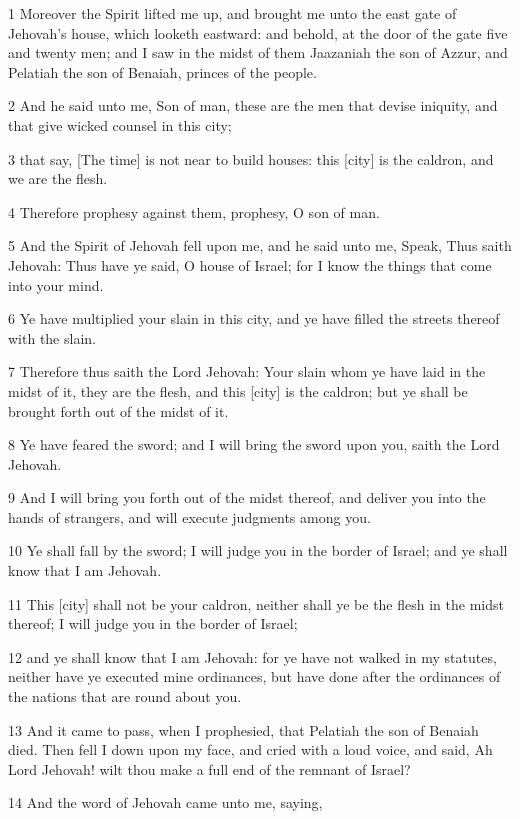 \par 1 Moreover the Spirit lifted me up, and brought me unto the east gate of Jehovah's house, which looketh eastward: and behold, at the door of the gate five and twenty men; and I saw in the midst of them Jaazaniah the son of Azzur, and Pelatiah the son of Benaiah, princes of the people.
\par 2 And he said unto me, Son of man, these are the men that devise iniquity, and that give wicked counsel in this city;
\par 3 that say, [The time] is not near to build houses: this [city] is the caldron, and we are the flesh.
\par 4 Therefore prophesy against them, prophesy, O son of man.
\par 5 And the Spirit of Jehovah fell upon me, and he said unto me, Speak, Thus saith Jehovah: Thus have ye said, O house of Israel; for I know the things that come into your mind.
\par 6 Ye have multiplied your slain in this city, and ye have filled the streets thereof with the slain.
\par 7 Therefore thus saith the Lord Jehovah: Your slain whom ye have laid in the midst of it, they are the flesh, and this [city] is the caldron; but ye shall be brought forth out of the midst of it.
\par 8 Ye have feared the sword; and I will bring the sword upon you, saith the Lord Jehovah.
\par 9 And I will bring you forth out of the midst thereof, and deliver you into the hands of strangers, and will execute judgments among you.
\par 10 Ye shall fall by the sword; I will judge you in the border of Israel; and ye shall know that I am Jehovah.
\par 11 This [city] shall not be your caldron, neither shall ye be the flesh in the midst thereof; I will judge you in the border of Israel;
\par 12 and ye shall know that I am Jehovah: for ye have not walked in my statutes, neither have ye executed mine ordinances, but have done after the ordinances of the nations that are round about you.
\par 13 And it came to pass, when I prophesied, that Pelatiah the son of Benaiah died. Then fell I down upon my face, and cried with a loud voice, and said, Ah Lord Jehovah! wilt thou make a full end of the remnant of Israel?
\par 14 And the word of Jehovah came unto me, saying,

